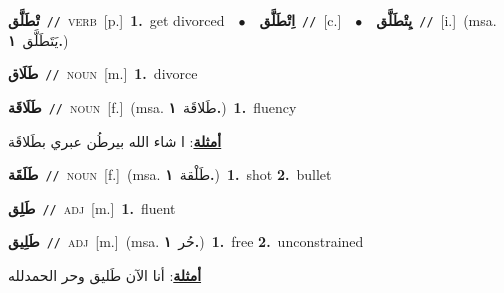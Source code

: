 \documentclass[10pt,a4paper,twoside]{article} %
\begin{document}
\begin{multicols}{2}
{\setlength\topsep{0pt}\textbf{\foreignlanguage{arabic}{تْطَلَّق}}\ {\color{gray}\texttt{//}\color{black}}\ \textsc{verb}\ [p.]\ \textbf{1.}~get divorced\ \ $\bullet$\ \ \setlength\topsep{0pt}\textbf{\foreignlanguage{arabic}{اِتْطَلَّق}}\ {\color{gray}\texttt{//}\color{black}}\ [c.]\ \ $\bullet$\ \ \setlength\topsep{0pt}\textbf{\foreignlanguage{arabic}{يِتْطَلَّق}}\ {\color{gray}\texttt{//}\color{black}}\ [i.]\ \color{gray}(msa. \foreignlanguage{arabic}{يَتَطَلَّق}~\foreignlanguage{arabic}{\textbf{١.}})\color{black}\ } \vspace{2mm}

{\setlength\topsep{0pt}\textbf{\foreignlanguage{arabic}{طَلَاق}}\ {\color{gray}\texttt{//}\color{black}}\ \textsc{noun}\ [m.]\ \textbf{1.}~divorce\ } \vspace{2mm}

{\setlength\topsep{0pt}\textbf{\foreignlanguage{arabic}{طَلَاقَة}}\ {\color{gray}\texttt{//}\color{black}}\ \textsc{noun}\ [f.]\ \color{gray}(msa. \foreignlanguage{arabic}{طَلاقَة}~\foreignlanguage{arabic}{\textbf{١.}})\color{black}\ \textbf{1.}~fluency\  \begin{flushright}\color{gray}\foreignlanguage{arabic}{\textbf{\underline{\foreignlanguage{arabic}{أمثلة}}}: ا شاء الله بيرطُن عبري بطَلاقَة}\end{flushright}\color{black}} \vspace{2mm}

{\setlength\topsep{0pt}\textbf{\foreignlanguage{arabic}{طَلَقَة}}\ {\color{gray}\texttt{//}\color{black}}\ \textsc{noun}\ [f.]\ \color{gray}(msa. \foreignlanguage{arabic}{طَلْقة}~\foreignlanguage{arabic}{\textbf{١.}})\color{black}\ \textbf{1.}~shot  \textbf{2.}~bullet\ } \vspace{2mm}

{\setlength\topsep{0pt}\textbf{\foreignlanguage{arabic}{طَلِق}}\ {\color{gray}\texttt{//}\color{black}}\ \textsc{adj}\ [m.]\ \textbf{1.}~fluent\ } \vspace{2mm}

{\setlength\topsep{0pt}\textbf{\foreignlanguage{arabic}{طَلِيق}}\ {\color{gray}\texttt{//}\color{black}}\ \textsc{adj}\ [m.]\ \color{gray}(msa. \foreignlanguage{arabic}{حُر}~\foreignlanguage{arabic}{\textbf{١.}})\color{black}\ \textbf{1.}~free  \textbf{2.}~unconstrained\  \begin{flushright}\color{gray}\foreignlanguage{arabic}{\textbf{\underline{\foreignlanguage{arabic}{أمثلة}}}: أنا الآن طَليق وحر الحمدلله}\end{flushright}\color{black}} \vspace{2mm}


\end{multicols}
\end{document}
